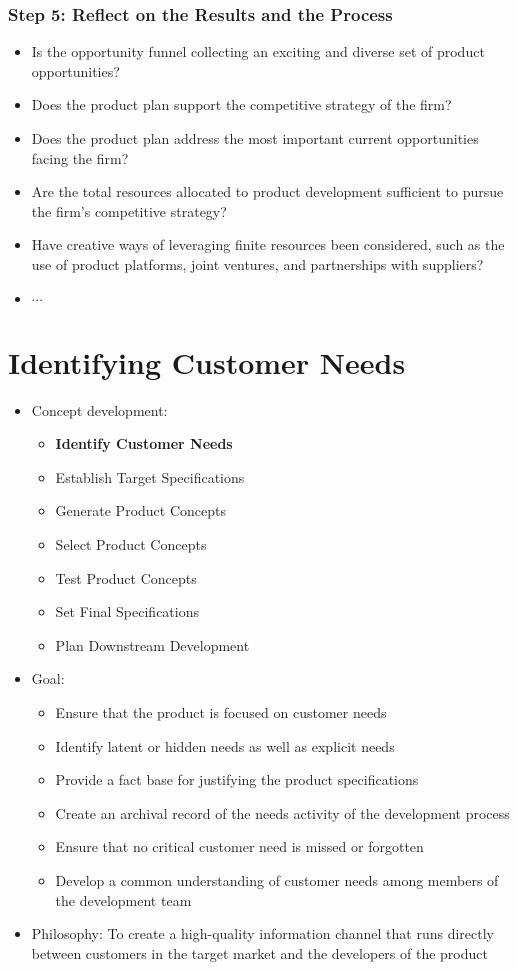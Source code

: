 \documentclass[a4paper,12pt,openany]{book}
\begin{document}
\subsection{Step 5: Reflect on the Results and the Process}
\begin{itemize}
    \item Is the opportunity funnel collecting an exciting and diverse set of product opportunities?
    \item Does the product plan support the competitive strategy of the firm?
    \item Does the product plan address the most important current opportunities facing the firm?
    \item Are the total resources allocated to product development sufficient to pursue the firm's competitive strategy?
    \item Have creative ways of leveraging finite resources been considered, such as the use of product platforms, joint ventures, and partnerships with suppliers?
    \item $\cdots$
\end{itemize}

\chapter{Identifying Customer Needs}
\begin{itemize}
    \item Concept development:
    \begin{itemize}
        \item \textbf{Identify Customer Needs}
        \item Establish Target Specifications
        \item Generate Product Concepts
        \item Select Product Concepts
        \item Test Product Concepts
        \item Set Final Specifications
        \item Plan Downstream Development
    \end{itemize}
    \item Goal:
    \begin{itemize}
        \item Ensure that the product is focused on customer needs
        \item Identify latent or hidden needs as well as explicit needs
        \item Provide a fact base for justifying the product specifications
        \item Create an archival record of the needs activity of the development process
        \item Ensure that no critical customer need is missed or forgotten
        \item Develop a common understanding of customer needs among members of the development team
    \end{itemize}
    \item Philosophy: To create a high-quality information channel that runs directly between customers in the target market and the developers of the product    
\end{itemize}
\end{document}

